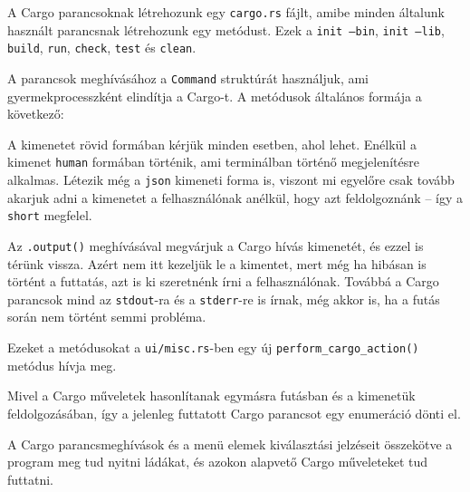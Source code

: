 
A Cargo parancsoknak létrehozunk egy \texttt{cargo.rs} fájlt, amibe minden általunk használt
parancsnak létrehozunk egy metódust.
Ezek a \texttt{init --bin}, \texttt{init --lib}, \texttt{build}, \texttt{run}, \texttt{check}, \texttt{test} és \texttt{clean}.

A parancsok meghívásához a \texttt{Command} struktúrát használjuk, ami gyermekprocesszként elindítja a Cargo-t.
A metódusok általános formája a következő:



A kimenetet rövid formában kérjük minden esetben, ahol lehet.
Enélkül a kimenet \texttt{human} formában történik, ami terminálban történő megjelenítésre alkalmas.
Létezik még a \texttt{json} kimeneti forma is, viszont mi egyelőre csak tovább akarjuk adni a kimenetet
a felhasználónak anélkül, hogy azt feldolgoznánk -- így a \texttt{short} megfelel.

Az \texttt{.output()} meghívásával megvárjuk a Cargo hívás kimenetét, és ezzel is térünk vissza.
Azért nem itt kezeljük le a kimentet, mert még ha hibásan is történt a futtatás,
azt is ki szeretnénk írni a felhasználónak.
Továbbá a Cargo parancsok mind az \texttt{stdout}-ra és a \texttt{stderr}-re is írnak,
még akkor is, ha a futás során nem történt semmi probléma.

Ezeket a metódusokat a \texttt{ui/misc.rs}-ben egy új \texttt{perform\_cargo\_action()}
metódus hívja meg.



Mivel a Cargo műveletek hasonlítanak egymásra futásban és a kimenetük feldolgozásában,
így a jelenleg futtatott Cargo parancsot egy enumeráció dönti el.

A Cargo parancsmeghívások és a menü elemek kiválasztási jelzéseit összekötve a
program meg tud nyitni ládákat, és azokon alapvető Cargo műveleteket tud futtatni.